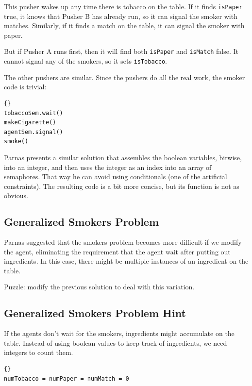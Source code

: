 \documentclass{book}
\newcommand{\clearemptydoublepage}{\newpage\cleardoublepage}
\begin{document}
This pusher wakes up any time there is tobacco on the
table.  If it finds {\tt isPaper} true, it knows that
Pusher B has already run, so it can signal the smoker
with matches.  Similarly, if it finds a match on the
table, it can signal the smoker with paper.

But if Pusher A runs first, then it will find both
{\tt isPaper} and {\tt isMatch} false.  It cannot signal
any of the smokers, so it sets {\tt isTobacco}.

The other pushers are similar.  Since the pushers do all
the real work, the smoker code is trivial:

\begin{latin}
\begin{latin}
\begin{lstlisting}[title={Smoker with tobacco}]{}
tobaccoSem.wait()
makeCigarette()
agentSem.signal()
smoke()
\end{lstlisting}
\end{latin}
\end{latin}

Parnas presents a similar solution that assembles the
boolean variables, bitwise, into an integer, and then
uses the integer as an index into an array of semaphores.
That way he can avoid using conditionals (one of the
artificial constraints).  The resulting code is a bit
more concise, but its function is not as obvious.


\subsection{Generalized Smokers Problem}

Parnas suggested that the smokers problem becomes more
difficult if we modify the agent, eliminating the requirement
that the agent wait after putting out ingredients.  In this
case, there might be multiple instances of an ingredient on
the table.

Puzzle: modify the previous solution to deal with this
variation.

\clearemptydoublepage
\subsection{Generalized Smokers Problem Hint}

If the agents don't wait for the smokers, ingredients might
accumulate on the table.  Instead of using boolean values to
keep track of ingredients, we need integers to count them.

\begin{latin}
\begin{latin}
\begin{lstlisting}[title={Generalized Smokers problem hint}]{}
numTobacco = numPaper = numMatch = 0
\end{lstlisting}
\end{latin}
\end{latin}
\end{document}

